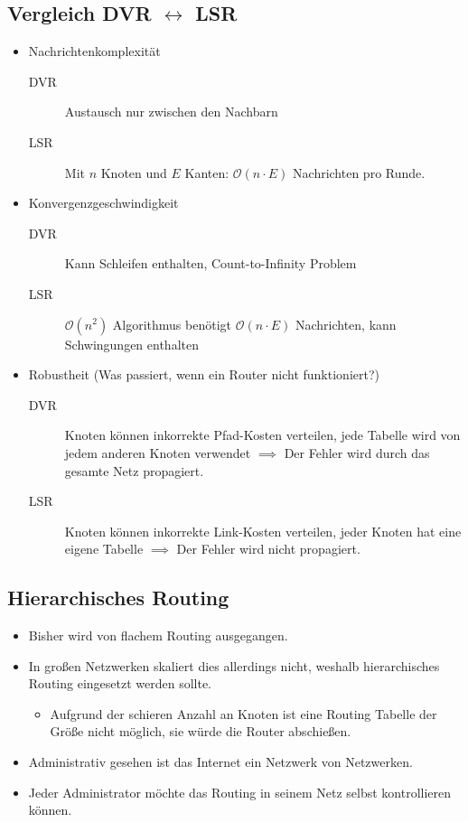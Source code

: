         \subsection{Vergleich DVR \(\leftrightarrow\) LSR}
            \begin{itemize}
            	\item Nachrichtenkomplexität
	            	\begin{description}
	            		\item[DVR] Austausch nur zwischen den Nachbarn
	            		\item[LSR] Mit \(n\) Knoten und \(E\) Kanten: \(\mathcal{O}(n \cdot E)\) Nachrichten pro Runde.
	            	\end{description}
            	\item Konvergenzgeschwindigkeit
	            	\begin{description}
	            		\item[DVR] Kann Schleifen enthalten, Count-to-Infinity Problem
	            		\item[LSR] \(\mathcal{O}(n^2)\) Algorithmus benötigt \(\mathcal{O}(n \cdot E)\) Nachrichten, kann Schwingungen enthalten
	            	\end{description}
            	\item Robustheit (Was passiert, wenn ein Router nicht funktioniert?)
	            	\begin{description}
	            		\item[DVR] Knoten können inkorrekte Pfad-Kosten verteilen, jede Tabelle wird von jedem anderen Knoten verwendet \(\implies\) Der Fehler wird durch das gesamte Netz propagiert.
	            		\item[LSR] Knoten können inkorrekte Link-Kosten verteilen, jeder Knoten hat eine eigene Tabelle \(\implies\) Der Fehler wird nicht propagiert.
	            	\end{description}
            \end{itemize}

        \subsection{Hierarchisches Routing}
            \begin{itemize}
            	\item Bisher wird von flachem Routing ausgegangen.
            	\item In großen Netzwerken skaliert dies allerdings nicht, weshalb hierarchisches Routing eingesetzt werden sollte.
                	\begin{itemize}
                		\item Aufgrund der schieren Anzahl an Knoten ist eine Routing Tabelle der Größe nicht möglich, sie würde die Router abschießen.
                	\end{itemize}
                \item Administrativ gesehen ist das Internet ein Netzwerk von Netzwerken.
                \item Jeder Administrator möchte das Routing in seinem Netz selbst kontrollieren können.
            \end{itemize}

